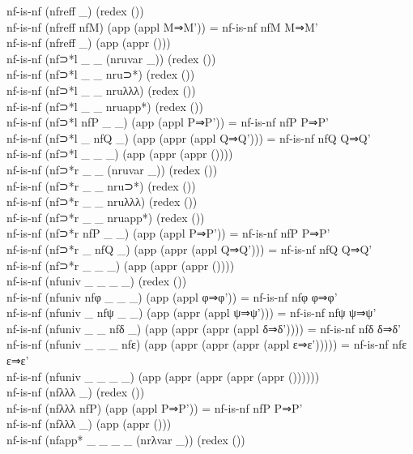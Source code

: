 {\begin{code}
{\>nf-is-nf (nfreff \_) (redex ())\<\\
\>nf-is-nf (nfreff nfM) (app (appl M⇒M')) = nf-is-nf nfM M⇒M'\<\\
\>nf-is-nf (nfreff \_) (app (appr ()))\<\\
\>nf-is-nf (nf⊃*l \_ \_ (nruvar \_)) (redex ()) \<\\
\>nf-is-nf (nf⊃*l \_ \_ nru⊃*) (redex ()) \<\\
\>nf-is-nf (nf⊃*l \_ \_ nruλλλ) (redex ()) \<\\
\>nf-is-nf (nf⊃*l \_ \_ nruapp*) (redex ()) \<\\
\>nf-is-nf (nf⊃*l nfP \_ \_) (app (appl P⇒P')) = nf-is-nf nfP P⇒P'\<\\
\>nf-is-nf (nf⊃*l \_ nfQ \_) (app (appr (appl Q⇒Q'))) = nf-is-nf nfQ Q⇒Q'\<\\
\>nf-is-nf (nf⊃*l \_ \_ \_) (app (appr (appr ())))\<\\
\>nf-is-nf (nf⊃*r \_ \_ (nruvar \_)) (redex ()) \<\\
\>nf-is-nf (nf⊃*r \_ \_ nru⊃*) (redex ()) \<\\
\>nf-is-nf (nf⊃*r \_ \_ nruλλλ) (redex ()) \<\\
\>nf-is-nf (nf⊃*r \_ \_ nruapp*) (redex ()) \<\\
\>nf-is-nf (nf⊃*r nfP \_ \_) (app (appl P⇒P')) = nf-is-nf nfP P⇒P'\<\\
\>nf-is-nf (nf⊃*r \_ nfQ \_) (app (appr (appl Q⇒Q'))) = nf-is-nf nfQ Q⇒Q'\<\\
\>nf-is-nf (nf⊃*r \_ \_ \_) (app (appr (appr ())))\<\\
\>nf-is-nf (nfuniv \_ \_ \_ \_) (redex ())\<\\
\>nf-is-nf (nfuniv nfφ \_ \_ \_) (app (appl φ⇒φ')) = nf-is-nf nfφ φ⇒φ'\<\\
\>nf-is-nf (nfuniv \_ nfψ \_ \_) (app (appr (appl ψ⇒ψ'))) = nf-is-nf nfψ ψ⇒ψ'\<\\
\>nf-is-nf (nfuniv \_ \_ nfδ \_) (app (appr (appr (appl δ⇒δ')))) = nf-is-nf nfδ δ⇒δ'\<\\
\>nf-is-nf (nfuniv \_ \_ \_ nfε) (app (appr (appr (appr (appl ε⇒ε'))))) = nf-is-nf nfε ε⇒ε'\<\\
\>nf-is-nf (nfuniv \_ \_ \_ \_) (app (appr (appr (appr (appr ())))))\<\\
\>nf-is-nf (nfλλλ \_) (redex ())\<\\
\>nf-is-nf (nfλλλ nfP) (app (appl P⇒P')) = nf-is-nf nfP P⇒P'\<\\
\>nf-is-nf (nfλλλ \_) (app (appr ()))\<\\
\>nf-is-nf (nfapp* \_ \_ \_ \_ (nrλvar \_)) (redex ())\<\\
}
\end{code}}
